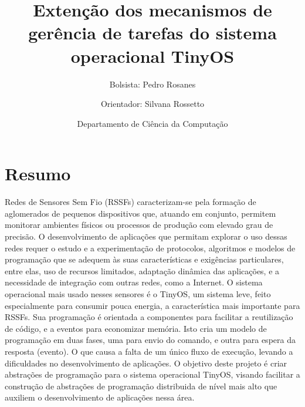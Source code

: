 \documentclass[a4paper,onecolumn, 10pt]{article}
\title{Extenção dos mecanismos de gerência de tarefas do sistema operacional TinyOS}
\author{Bolsista: Pedro Rosanes \and Orientador: Silvana Rossetto \and Departamento de Ciência da Computação}
\date{}
\begin{document}
\begin{titlepage}
\maketitle

\tableofcontents
\end{titlepage}



\section{Resumo}\label{resumo}
Redes de Sensores Sem Fio (RSSFs) caracterizam-se pela formação de aglomerados de pequenos 
dispositivos que, atuando em conjunto, permitem monitorar ambientes físicos ou processos de 
produção com elevado grau de precisão. O desenvolvimento de aplicações que permitam explorar 
o uso dessas redes requer o estudo e a experimentação de protocolos, algoritmos e modelos de 
programação que se adequem às suas características e exigências particulares, entre elas, uso
de recursos limitados, adaptação dinâmica das aplicações, e a necessidade de integração com
outras redes, como a Internet.
O sistema operacional mais usado nesses sensores é o TinyOS, um sistema leve, feito especialmente para consumir pouca
energia, a característica mais importante para RSSFs. Sua programação é orientada a componentes para facilitar a
reutilização de código, e a eventos para economizar memória. Isto cria um modelo de programação em duas fases, uma para envio
do comando, e outra para espera da resposta (evento). O que causa a falta de um único fluxo de execução, levando a dificuldades no 
desenvolvimento de aplicações. O objetivo deste projeto é criar abstrações de programação para
o sistema operacional TinyOS, visando facilitar a construção de abstrações de programação distribuida de nível mais alto que 
auxiliem o desenvolvimento de aplicações nessa área.
\end{document}
